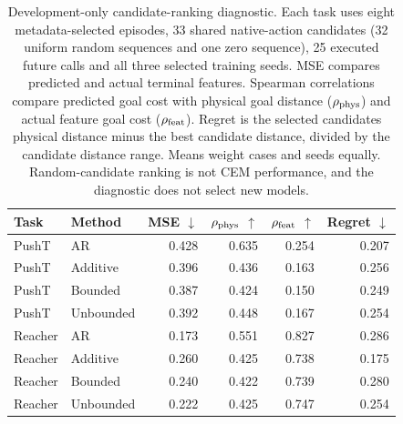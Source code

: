 \begin{table}[tbp]\centering\small
\begin{tabular}{@{}llrrrr@{}}\toprule
Task & Method & MSE $\downarrow$ & $\rho_{\rm phys}$ $\uparrow$ & $\rho_{\rm feat}$ $\uparrow$ & Regret $\downarrow$ \\ \midrule
PushT & AR & 0.428 & 0.635 & 0.254 & 0.207 \\
PushT & Additive & 0.396 & 0.436 & 0.163 & 0.256 \\
PushT & Bounded & 0.387 & 0.424 & 0.150 & 0.249 \\
PushT & Unbounded & 0.392 & 0.448 & 0.167 & 0.254 \\
Reacher & AR & 0.173 & 0.551 & 0.827 & 0.286 \\
Reacher & Additive & 0.260 & 0.425 & 0.738 & 0.175 \\
Reacher & Bounded & 0.240 & 0.422 & 0.739 & 0.280 \\
Reacher & Unbounded & 0.222 & 0.425 & 0.747 & 0.254 \\
\bottomrule\end{tabular}
\caption{Development-only candidate-ranking diagnostic. Each task uses eight metadata-selected episodes, 33 shared native-action candidates (32 uniform random sequences and one zero sequence), 25 executed future calls and all three selected training seeds. MSE compares predicted and actual terminal features. Spearman correlations compare predicted goal cost with physical goal distance ($\rho_{\rm phys}$) and actual feature goal cost ($\rho_{\rm feat}$). Regret is the selected candidate\textquotesingle s physical distance minus the best candidate distance, divided by the candidate distance range. Means weight cases and seeds equally. Random-candidate ranking is not CEM performance, and the diagnostic does not select new models.}
\label{tab:development-action-ranking}\end{table}
